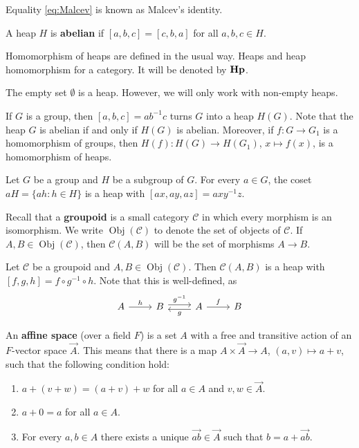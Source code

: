 \documentclass{svmult}
\newcommand{\Obj}{\operatorname{Obj}}
\newcommand{\category}[1]{{\normalfont\textbf{#1}}}
\newcommand{\Hp}{\category{Hp}}
\begin{document}
Equality \eqref{eq:Malcev} is known as Malcev's identity. 

\begin{definition}
    A heap $H$ is \textbf{abelian} if $[a,b,c]=[c,b,a]$ for all $a,b,c\in H$. 
\end{definition}

Homomorphism of heaps are defined in the usual way. Heaps and heap homomorphism for a category. 
It will be denoted by $\Hp$. 

The empty set $\emptyset$ is a heap. However, we will only work with non-empty heaps. 

\begin{example}
\label{exa:H(G)}
    If $G$ is a group, then $[a,b,c]=ab^{-1}c$ turns $G$ into a heap $H(G)$. Note that
    the heap $G$ is abelian if and only if $H(G)$ is abelian. Moreover, 
    if $f\colon G\to G_1$ is a homomorphism of groups, then $H(f)\colon H(G)\to H(G_1)$, $x\mapsto f(x)$, is a 
    homomorphism of heaps. 
\end{example}

\begin{example}
    Let $G$ be a group and $H$ be a subgroup of $G$. For every $a\in G$, the coset
    $aH=\{ah:h\in H\}$ is a heap with
    $[ax,ay,az]=axy^{-1}z$. 
\end{example}

Recall that a \textbf{groupoid} is a small category $\mathcal{C}$ in which every morphism is an isomorphism. 
We write $\Obj(\mathcal{C})$ to denote the set of objects of $\mathcal{C}$. If $A,B\in\Obj(\mathcal{C})$, 
then $\mathcal{C}(A,B)$ will be the set of morphisms $A\to B$. 

\begin{example}
    Let $\mathcal{C}$ be a groupoid and $A,B\in\Obj(\mathcal{C})$. Then $\mathcal{C}(A,B)$ is a heap with
    $[f,g,h]=f\circ g^{-1}\circ h$. Note that this is well-defined, as
    \[
    \begin{tikzcd}
	A & B & A & B
	\arrow["h", from=1-1, to=1-2]
	\arrow["{g^{-1}}", shift left=1, from=1-2, to=1-3]
	\arrow["f", from=1-3, to=1-4]
	\arrow["g", shift left=1, from=1-3, to=1-2]
    \end{tikzcd}
    \]
\end{example}

An \textbf{affine space} (over a field $F$) 
is a set $A$ with a free and transitive action of an $F$-vector space $\overrightarrow{A}$. This means
that there is a map $A\times\overrightarrow{A}\to A$, $(a,v)\mapsto a+v$, such that 
the following condition hold:
\begin{enumerate}
    \item $a+(v+w)=(a+v)+w$ for all $a\in A$ and $v,w\in\overrightarrow{A}$.
    \item $a+0=a$ for all $a\in A$.
    \item For every $a,b\in A$ there exists a unique $\overrightarrow{ab}\in\overrightarrow{A}$ such that
    $b=a+\overrightarrow{ab}$.
\end{enumerate}
\end{document}
